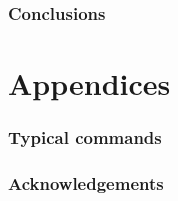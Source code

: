 \documentclass[preprint,12pt]{elsarticle}
\begin{document}
\section{Conclusions}
\label{sec:conclusions}


\cleardoublepage

\part{Appendices}
\appendix

\section{Typical  commands}
\label{app:agilerunmc}


\section{Acknowledgements}
\label{app:acknowledgements}



\cleardoublepage



\end{document}
